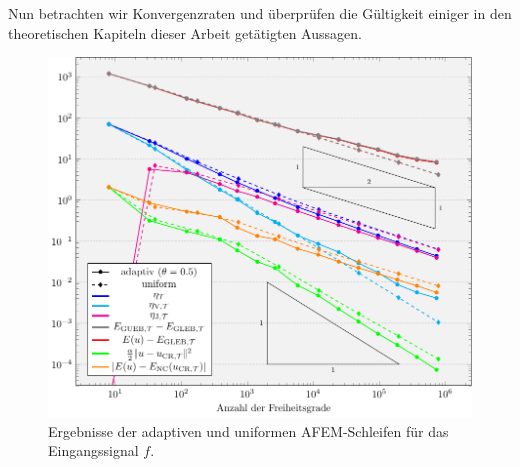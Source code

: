 Nun betrachten wir Konvergenzraten und überprüfen die Gültigkeit einiger in den
theoretischen Kapiteln dieser Arbeit getätigten Aussagen.
\begin{figure}[p]
  \centering
  \includegraphics[width=\linewidth]
    {pictures/chapExperiments/secExactSol/f01/conv.pdf}
  \caption{Ergebnisse der adaptiven und uniformen AFEM-Schleifen für das 
  Eingangssignal $f$.}
  \label{fig:f01Convergence}
\end{figure}
